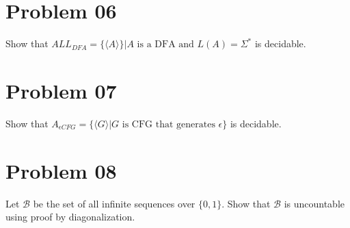 \documentclass{article}
\begin{document}
\section{Problem 06}
Show that \(ALL_{DFA} = \{\langle A\rangle\} | \text{$A$ is a DFA and $L(A) = \Sigma^*$}\) is decidable.

\section{Problem 07}
Show that \(A_{\epsilon CFG} = \{ \langle G\rangle | \text{$G$ is CFG that generates $\epsilon$}\}\) is decidable.

\section{Problem 08}
Let \(\mathcal{B}\) be the set of all infinite sequences over \(\{0,1\}\). Show that \(\mathcal{B}\) is uncountable using proof by diagonalization.
\end{document}
